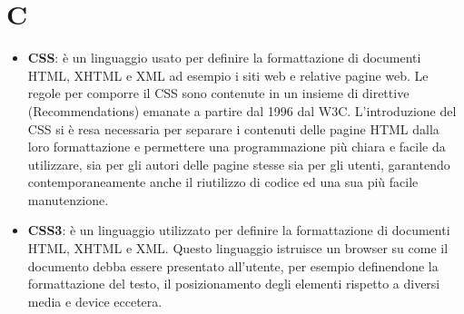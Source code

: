\section{C}
\begin{itemize} 
	\item
	\textbf{CSS}: è un linguaggio usato per definire la formattazione di documenti HTML, XHTML e XML ad esempio i siti web e relative pagine web. Le regole per comporre il CSS sono contenute in un insieme di direttive (Recommendations) emanate a partire dal 1996 dal W3C.
	L'introduzione del CSS si è resa necessaria per separare i contenuti delle pagine HTML dalla loro formattazione e permettere una programmazione più chiara e facile da utilizzare, sia per gli autori delle pagine stesse sia per gli utenti, garantendo contemporaneamente anche il riutilizzo di codice ed una sua più facile manutenzione. 
	\item
	\textbf{CSS3}: è un linguaggio utilizzato per definire la formattazione di documenti HTML, XHTML e XML.
	Questo linguaggio istruisce un browser su come il documento debba essere presentato all'utente, per esempio definendone la formattazione del testo, il posizionamento degli elementi rispetto a diversi media e device eccetera.
\end{itemize}